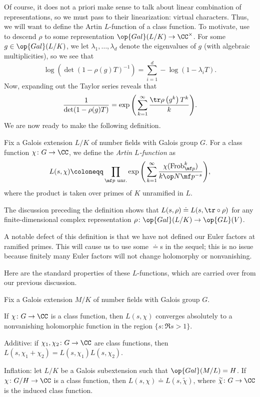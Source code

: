 \documentclass[../thesis.tex]{subfiles}
\begin{document}
Of course, it does not a priori make sense to talk about linear combination of representations, so we must pass to their linearization: virtual characters. Thus, we will want to define the Artin $L$-function of a class function. To motivate, use  to descend $\rho$ to some representation $\op{Gal}(L/K)\to\CC^\times$. For some $g\in\op{Gal}(L/K)$, we let $\lambda_1,\ldots,\lambda_d$ denote the eigenvalues of $g$ (with algebraic multiplicities), so we see that
\[\log\left(\det(1-\rho(g)T)^{-1}\right)=\sum_{i=1}^d-\log(1-\lambda_iT).\]
Now, expanding out the Taylor series reveals that
\[\frac1{\det(1-\rho(g)T)}=\exp\Bigg(\sum_{k=1}^\infty\frac{\tr\rho\left(g^k\right)T^k}k\Bigg).\]
We are now ready to make the following definition.
\begin{defihelper} 
	Fix a Galois extension $L/K$ of number fields with Galois group $G$. For a class function $\chi\colon G\to\CC$, we define the \textit{Artin $L$-function} as
	\[L(s,\chi)\coloneqq\prod_{\mf p\text{ unr.}}\exp\Bigg(\sum_{k=1}^\infty\frac{\chi(\mathrm{Frob}_{\mf p}^k)}{k\op N\mf p^{-s}}\Bigg),\]
	where the product is taken over primes of $K$ unramified in $L$.
\end{defihelper}
\begin{example} \label{ex:artin-l-func-rep-to-char}
	The discussion preceding the definition shows that $L(s,\rho)\doteq L(s,{\tr}\circ\rho)$ for any finite-dimensional complex representation $\rho\colon\op{Gal}(L/K)\to\op{GL}(V)$.
\end{example}
\begin{remark}
	A notable defect of this definition is that we have not defined our Euler factors at ramified primes. This will cause us to use some $\doteq$s in the sequel; this is no issue because finitely many Euler factors will not change holomorphy or nonvanishing.
\end{remark}
Here are the standard properties of these $L$-functions, which are carried over from our previous discussion.
\begin{lemma} \label{lem:artin-class-basic}
	Fix a Galois extension $M/K$ of number fields with Galois group $G$.
	\begin{listalph}
		\item If $\chi\colon G\to\CC$ is a class function, then $L(s,\chi)$ converges absolutely to a nonvanishing holomorphic function in the region $\{s:\Re s>1\}$.
		\item Additive: if $\chi_1,\chi_2\colon G\to\CC$ are class functions, then $L(s,\chi_1+\chi_2)=L(s,\chi_1)L(s,\chi_2)$.
		\item Inflation: let $L/K$ be a Galois subextension such that $\op{Gal}(M/L)=H$. If $\chi\colon G/H\to\CC$ is a class function, then $L(s,\chi)\doteq L(s,\widetilde\chi)$, where $\widetilde\chi\colon G\to\CC$ is the induced class function.
	\end{listalph}
\end{lemma}
\end{document}
